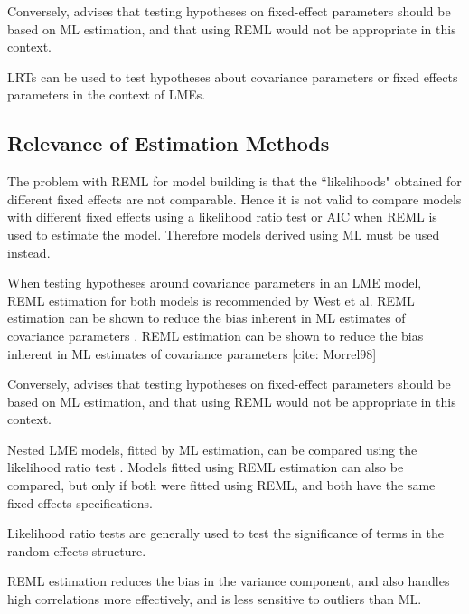 \documentclass[12pt, a4paper]{report}
\theoremstyle{plain}
\theoremstyle{definition}
\theoremstyle{remark}
\begin{document}
	Conversely, \citet{ARoy2009} advises that testing hypotheses on fixed-effect parameters should be based on ML estimation, and that using REML would not be appropriate in this
	context.
	
	LRTs can be used to test hypotheses about covariance parameters or fixed effects
	parameters in the context of LMEs.
	
	
	
	
	\subsection{Relevance of Estimation Methods}
	
	The problem with REML for model building is that the ``likelihoods" obtained for different fixed effects are not comparable. Hence it is not valid to compare models with different fixed effects using a likelihood ratio test or AIC when REML is used to estimate the model. Therefore models derived using ML must be used instead.
	
	
	When testing hypotheses around covariance parameters in an LME model, REML estimation for both models is recommended by West et al. REML estimation can be shown to reduce the bias inherent in ML estimates of covariance parameters \citep{west}. REML estimation can be shown to reduce the bias inherent in ML estimates of covariance parameters [cite: Morrel98]
	
	Conversely, \citet{pb} advises that testing hypotheses on fixed-effect parameters should be based on ML estimation, and that using REML would not be appropriate in this context.
	
	Nested LME models, fitted by ML estimation, can be compared using the likelihood ratio test \citep{Lehmann2006}.
	Models fitted using REML estimation can also be compared, but only if both were fitted using REML, and both have the same fixed effects specifications.
	
	Likelihood ratio tests are generally used to test the significance of terms in the random effects structure.
	
	REML estimation reduces the bias in the variance component, and also handles high correlations more effectively, and is less sensitive to outliers than ML.  
	
	
	
	
	
	
	
	
\end{document}
